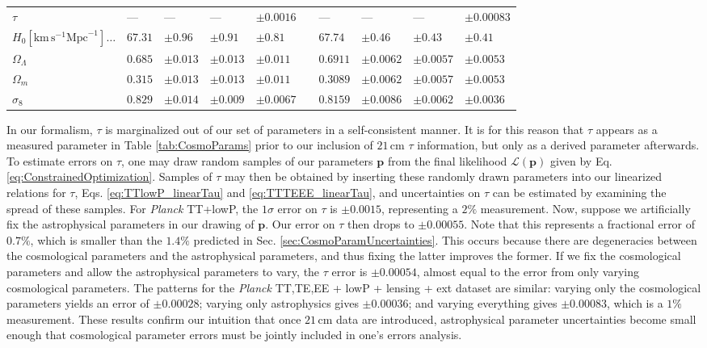 \documentclass[twocolumn,aps,prd,nofootinbib,showpacs,superscriptaddress]{revtex4-1}
\begin{document}
\begin{table}
\begin{ruledtabular}
\begin{tabular}{lllllcllll}
$ \tau $\dotfill  & --- & ---  & --- & $ \mathbf{\pm 0.0016}$ &&---  & ---  & ---& $ \mathbf{\pm 0.00083}$ \\
$H_0 \left[ \textrm{km}\,\textrm{s}^{-1}\textrm{Mpc}^{-1}\right] \dots$ \dotfill & $67.31 $&$\pm 0.96$ & $\pm0.91$ &  $\pm 0.81$ && $67.74 $&$\pm 0.46$ & $\pm 0.43$ &  $\pm 0.41$ \\
$\Omega_\Lambda$ \dotfill & $0.685 $&$\pm 0.013$ &  $ \pm 0.013$ &  $\pm 0.011$ && $0.6911$& $ \pm 0.0062$ & $\pm 0.0057$ &  $\pm 0.0053$ \\
$\Omega_m$ \dotfill & $0.315$& $ \pm 0.013$ &   $ \pm 0.013$ & $\pm 0.011$&& $0.3089 $&$\pm 0.0062$ & $\pm 0.0057$ &  $\pm 0.0053$  \\
$\sigma_8$ \dotfill & $0.829$&$ \pm 0.014$ & $\pm 0.009$ & $\mathbf{\pm 0.0067}$ && $0.8159$& $ \pm 0.0086$ & $\pm 0.0062$ &  $\mathbf{\pm 0.0036}$\\
\end{tabular}
\end{ruledtabular}
\end{table}

In our formalism, $\tau$ is marginalized out of our set of parameters in a self-consistent manner. It is for this reason that $\tau$ appears as a measured parameter in Table \ref{tab:CosmoParams} prior to our inclusion of $21\,\textrm{cm}$ $\tau$ information, but only as a derived parameter afterwards. To estimate errors on $\tau$, one may draw random samples of our parameters $\mathbf{p}$ from the final likelihood $\mathcal L (\mathbf{p})$ given by Eq. \eqref{eq:ConstrainedOptimization}. Samples of $\tau$ may then be obtained by inserting these randomly drawn parameters into our linearized relations for $\tau$, Eqs. \eqref{eq:TTlowP_linearTau} and \eqref{eq:TTTEEE_linearTau}, and uncertainties on $\tau$ can be estimated by examining the spread of these samples. For \emph{Planck} TT+lowP, the $1\sigma$ error on $\tau$ is $\pm 0.0015$, representing a $2\%$ measurement. Now, suppose we artificially fix the astrophysical parameters in our drawing of $\mathbf{p}$. Our error on $\tau$ then drops to $\pm 0.00055$. Note that this represents a fractional error of $0.7\%$, which is smaller than the $1.4\%$ predicted in Sec. \ref{sec:CosmoParamUncertainties}. This occurs because there are degeneracies between the cosmological parameters and the astrophysical parameters, and thus fixing the latter improves the former. If we fix the cosmological parameters and allow the astrophysical parameters to vary, the $\tau$ error is $\pm 0.00054$, almost equal to the error from only varying cosmological parameters. The patterns for the \emph{Planck} TT,TE,EE + lowP + lensing + ext dataset are similar: varying only the cosmological parameters yields an error of $\pm 0.00028$; varying only astrophysics gives $\pm 0.00036$; and varying everything gives $\pm 0.00083$, which is a $1\%$ measurement. These results confirm our intuition that once $21\,\textrm{cm}$ data are introduced, astrophysical parameter uncertainties become small enough that cosmological parameter errors must be jointly included in one's errors analysis.
\end{document}
